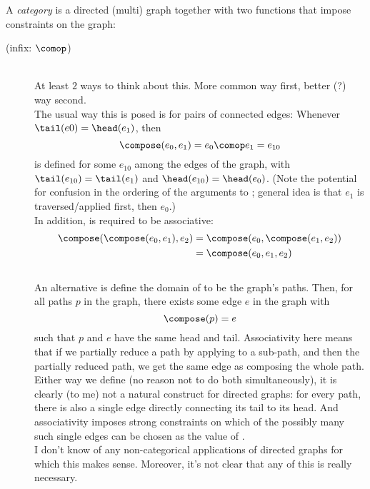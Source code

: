 \documentclass[11pt]{book}
\begin{document}
\begin{definition}
A \textit{category} is a directed (multi) graph 
together with two functions that impose constraints
on the graph:
\begin{description}
\item[\compose \textrm{\textup{(infix: $\comop$)}}]\mbox{}\\
At least $2$ ways to think about this. 
More common way first, better (?) way second.\\
The usual way this is posed is for pairs of connected edges:
Whenever $\tail(e0) = \head(e_1)$,
then
\[ \compose(e_0,e_1) = e_0 \comop e_1 = e_{10} \]
is defined
for some $e_{10}$ among the edges of the graph,
with $\tail(e_{10}) = \tail(e_1)$
and $\head(e_{10}) = \head(e_0)$.
(Note the potential for confusion 
in the ordering of the arguments to \compose;
general idea is that $e_1$ is traversed/applied first,
then $e_0$.) \\
In addition, \compose is required to be associative:
\begin{align*}
\compose(\compose(e_0,e_1),e_2) 
&
= \compose(e_0,\compose(e_1,e_2))
\\
&
= \compose(e_0,e_1,e_2)
\end{align*}
\\
An alternative is define the domain of \compose
to be the graph's paths. 
Then, for all paths $p$ in the graph,
there exists some edge $e$ in the graph
with 
\begin{equation*}
\compose(p) = e
\end{equation*} 
such that 
$p$ and $e$ have the same head and tail.
Associativity here means that if we partially reduce a path
by applying \compose to a sub-path,
and then \compose the partially reduced path,
we get the same edge as composing the whole path.
\\
Either way we define \compose (no reason not to do both
simultaneously), it is clearly (to me) not a natural construct
for directed graphs: for every path, there is also 
a single edge directly connecting its tail to its head.
And associativity imposes strong constraints on which of the possibly
many such single edges can be chosen as the value of \compose.
\\
I don't know of any non-categorical applications of directed graphs
for which this makes sense.
Moreover, it's not clear that any of this is really necessary.
\\
\item[\identity]\mbox{}\\

\end{description}
\end{definition}
\end{document}
